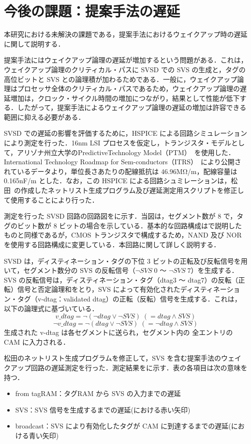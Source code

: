
\chapter{今後の課題：提案手法の遅延}
\label{sec:appendix3}
本研究における未解決の課題である，提案手法におけるウェイクアップ時の遅延に関して説明する．

提案手法にはウェイクアップ論理の遅延が増加するという問題がある．これは，ウェイクアップ論理のクリティカル・パスに SVSD での SVS の生成と，タグの高位ビットと SVS との論理積が加わるためである．一般に，ウェイクアップ論理はプロセッサ全体のクリティカル・パスであるため，ウェイクアップ論理の遅延増加は，クロック・サイクル時間の増加につながり，結果として性能が低下する．したがって，提案手法によるウェイクアップ論理の遅延の増加は許容できる範囲に抑える必要がある．

SVSD での遅延の影響を評価するために，HSPICE による回路シミュレーションにより測定を行った．16nm LSI プロセスを仮定し，トランジスタ・モデルとして，アリゾナ州立大学のPredictiveTechnology Model（PTM）~\cite{model2012}を使用した．International Technology Roadmap for Sem-conductors（ITRS）~\cite{itrs2012}により公開されているデータより，単位長さあたりの配線抵抗は 46.96MΩ/m，配線容量は 0.165nF/m とした．なお，この HSPICE による回路シュミレーションは，松田~\cite{matsuda-thesis}の作成したネットリスト生成プログラム及び遅延測定用スクリプトを修正して使用することにより行った． 

測定を行った SVSD 回路の回路図をに示す．当図は，セグメント数が 8 で，タグのビット数が 8 ビットの場合を示している．基本的な回路構成はで説明したものと同様であるが，CMOS トランジスタで構成するため，NAND 及び NOR を使用する回路構成に変更している．本回路に関して詳しく説明する．

SVSD は，ディスティネーション・タグの下位 3 ビットの正転及び反転信号を用いて，セグメント数分の SVS の反転信号（$\lnot SVS\;0$ 〜 $\lnot SVS\;7$）を生成する． SVS の反転信号は，ディスティネーション・タグ（dtag3 〜 dtag7）の反転（正転）信号と否定論理和をとり，SVS によって有効化されたディスティネーション・タグ（v-dtag：validated dtag）の正転（反転）信号を生成する．これは，以下の論理式に基づいている．
\[
  v\_dtag = \lnot (\lnot dtag \lor \lnot SVS) \; (= dtag \land SVS) 
\]
\[
  \lnot v\_dtag = \lnot (dtag \lor \lnot SVS) \; (= \lnot dtag \land SVS) 
\]
生成された v-dtag は各セグメントに送られ，セグメント内の 全エントリの CAM に入力される．

松田のネットリスト生成プログラムを修正して，SVS を含む提案手法のウェイクアップ回路の遅延測定を行った．測定結果をに示す．表の各項目は次の意味を持つ．
  \begin{itemize}
    \item from tagRAM：タグRAM から SVS  の入力までの遅延
    \item SVS：SVS 信号を生成するまでの遅延(における赤い矢印)
    \item broadcast：SVS により有効化したタグが CAM に到達するまでの遅延(における青い矢印) 
  \end{itemize}

